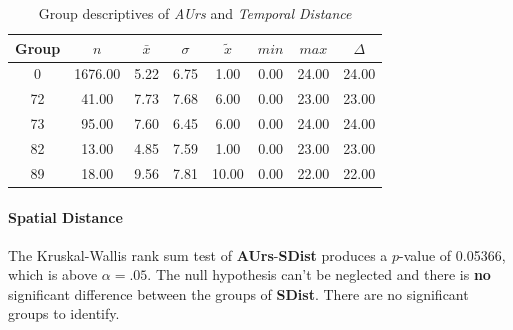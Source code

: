\begin{table}[ht]
	\small
	\centering
	\begin{tabular}{c|c|c|c|c|c|c|c}
        \toprule
        Group & $n$ & $\bar{x}$ & $\sigma$ & $\tilde{x}$ & $min$ & $max$ & $\Delta$ \\ 
		\midrule
        0 & 1676.00 & 5.22 & 6.75 & 1.00 & 0.00 & 24.00 & 24.00 \\ 
		72 & 41.00 & 7.73 & 7.68 & 6.00 & 0.00 & 23.00 & 23.00 \\ 
		73 & 95.00 & 7.60 & 6.45 & 6.00 & 0.00 & 24.00 & 24.00 \\ 
		82 & 13.00 & 4.85 & 7.59 & 1.00 & 0.00 & 23.00 & 23.00 \\ 
		89  & 18.00 & 9.56 & 7.81 & 10.00 & 0.00 & 22.00 & 22.00 \\ 
		\bottomrule
	\end{tabular}
	\caption{Group descriptives of \textit{AUrs} and \textit{Temporal Distance}}
	\label{tbl:descriptives_baysis_matched_AUrs_TDist}
\end{table}

\paragraph{Spatial Distance}
The Kruskal-Wallis rank sum test of \textbf{AUrs}-\textbf{SDist} produces a $p$-value of 0.05366, which is above $\alpha=.05$. The null hypothesis can't be neglected and there is \textbf{no} significant difference between the groups of \textbf{SDist}. There are no significant groups to identify.

